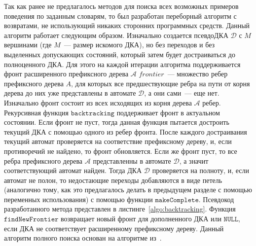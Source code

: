 Так как ранее не предлагалось методов для поиска всех возможных примеров поведения по заданным словарям, то был разработан переборный алгоритм с возвратами, не использующий никаких сторонних программных средств.
Данный алгоритм работает следующим образом.
Изначально создается псевдоДКА $\mathcal{D}$ с $M$ вершинами (где $M$~--- размер искомого ДКА), но без переходов и без выделенных допускающих состояний, который затем будет достраиваться до полноценного ДКА.
Для этого на каждой итерации алгоритма поддерживается фронт расширенного префиксного дерева $\mathcal{A}$ $frontier$~--- множество ребер префиксного дерева $A$, для которых все предшествующие ребра на пути от корня дерева до них уже представлены в автомате $\mathcal{D}$, а они сами~--- еще нет.
Изначально фронт состоит из всех исходящих из корня дерева $\mathcal{A}$ ребер.
Рекурсивная функция $\mathtt{backtracking}$ поддерживает фронт в актуальном состоянии.
Если фронт не пуст, тогда данная функция пытается достроить текущий ДКА с помощью одного из ребер фронта.
После каждого достраивания текущий автомат проверяется на соответствие префиксному дереву, и, если противоречий не найдено, то фронт обновляется.
Если же фронт пуст, то все ребра префиксного дерева $\mathcal{A}$ представленны в автомате $\mathcal{D}$, а значит соответствующий автомат найден.
Тогда ДКА $\mathcal{D}$ проверяется на полноту, и, если автомат не полон, то недостающие переходы добавляются в виде петель (аналогично тому, как это предлагалось делать в предыдущем разделе с помощью переменных использования) с помощью функции $\mathtt{makeComplete}$.
Псевдокод разработанного метода представлен в листинге~\ref{algo:backtracking}.
Функция $\mathtt{findNewFrontier}$ возвращает новый фронт для дополненного ДКА или $\mathtt{NULL}$, если ДКА не соответствует расширенному префиксному дереву.
Данный алгоритм полного поиска основан на алгоритме из~\cite{DBLP:journals/sttt/UlyantsevBS18}.


